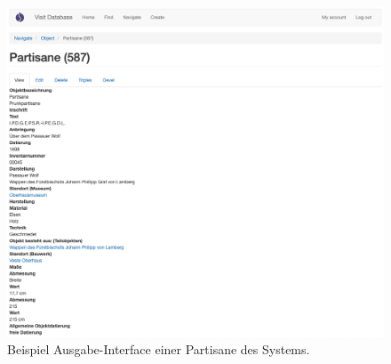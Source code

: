 \begin{figure}[htb]
    \centering
    \includegraphics[width=\textwidth]{Figures/berndl/wisskiViewObject}
    \caption{\label{fig:wisskiViewObject} Beispiel Ausgabe-Interface einer Partisane des \visit \wisski Systems.}
\end{figure}